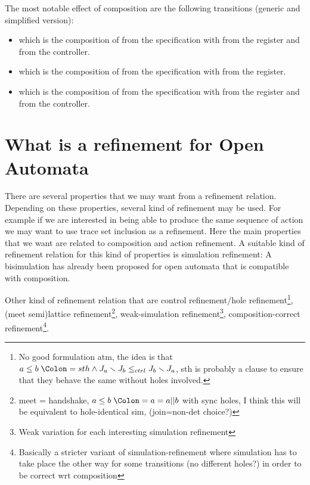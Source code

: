 \documentclass{article}
\begin{document}
\begin{exi}
The most notable effect of composition are the following transitions (generic and simplified version):
\begin{itemize}
\item {} which is the composition of  from the specification with  from the register and  from the controller.
\item {} which is the composition of  from the specification with  from the register.
\item {} which is the composition of  from the specification with  from the register and  from the controller.
\end{itemize}
\end{exi}


\section{What is a refinement for Open Automata}
There are several properties that we may want from a refinement relation.
Depending on these properties, several kind of refinement may be used.
For example if we are interested in being able to produce the same sequence of action we may want to use trace set inclusion as a refinement.
Here the main properties that we want are related to composition and action refinement.
A suitable kind of refinement relation for this kind of properties is simulation refinement:
A bisimulation has already been proposed for open automata  that is compatible with composition.

Other kind of refinement relation that  are control refinement/hole refinement\footnote{No good formulation atm, the idea is that \(a \leq b \defnotation sth \wedge J_a \setminus J_b \leq_{ctrl} J_b \setminus J_a\), sth is probably a clause to ensure that they behave the same without holes involved.}, (meet semi)lattice refinement\footnote{meet = handshake, \(a \leq b \defnotation a = a || b\) with sync holes, I think this will be equivalent to hole-identical sim, (join=non-det choice?)}, weak-simulation refinement\footnote{Weak variation for each interesting simulation refinement}, composition-correct refinement\footnote{Basically a stricter variant of simulation-refinement where simulation has to take place the other way for some transitions (no different holes?) in order to be correct wrt composition}.
\end{document}
